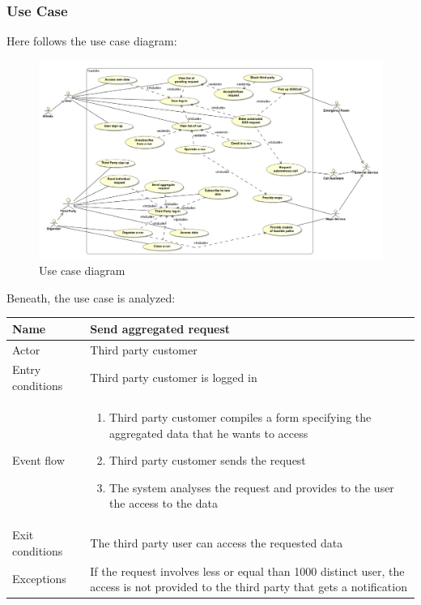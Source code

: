 \subsubsection{Use Case}
Here follows the use case diagram: \\

\begin{figure}[H]
\includegraphics[width=\linewidth]{Images/usecase}
\caption{Use case diagram}
\label{fig:usecasediagram}
\end{figure}

\par 
Beneath, the use case is analyzed:	\\

\begin{table}[H]
\begin{tabularx}{\textwidth}{|l|X|}
\hline
 Name & Send aggregated request \\ \hline
 Actor & Third party customer  \\ \hline
 Entry conditions & Third party customer is logged in\\ \hline
 Event flow & 
 \begin{enumerate}
 	\item Third party customer compiles a form specifying the aggregated data that he wants to access
 	\item Third party customer sends the request
 	\item The system analyses the request and provides to the user the access to the data 
 \end{enumerate}   \\ \hline
 Exit conditions & The third party user can access the requested data \\ \hline
 Exceptions & If the request involves less or equal than 1000 distinct user, the access is not provided to the third party that gets a notification \\ \hline
\end{tabularx}
\end{table}

